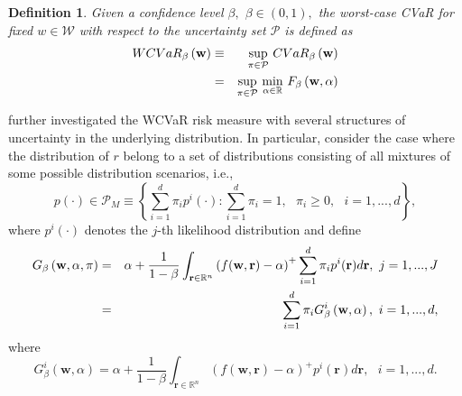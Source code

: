 \documentclass[a4paper,12pt]{report}
\newtheorem{definition}{Definition}
\begin{document}
\begin{refsection}
\bigskip

\begin{definition}
	Given a confidence level $\beta ,$ $\beta \in (0,1),$ the worst-case CVaR
	for fixed $w\in \mathcal{W}$ with respect to the uncertainty set $\mathcal{P}
	$ is defined as
	\begin{eqnarray}
	WCVaR_{\beta }\left( \mathbf{w}\right) &\equiv &\underset{\pi \in \mathcal{P}%
	}{\sup }~ CVaR_{\beta }\left( \mathbf{w}\right)  \notag \\
	&=&\underset{\pi \in \mathcal{P}}{\sup }~\underset{\alpha \in
		\mathbb{R}
	}{\min }~F_{\beta }\left(\mathbf{w},\alpha \right)  \label{14}
	\end{eqnarray}
\end{definition}

\citet*{zhu2009worst} further investigated the WCVaR risk measure with
several structures of uncertainty in the underlying distribution. In
particular, \citet*{zhu2009worst} consider the case where the distribution
of $r$ belong to a set of distributions consisting of all mixtures of some
possible distribution scenarios, i.e.,
\begin{equation}
p\left( \cdot \right) \in \mathcal{P}_{M}\equiv \left\{ \sum_{i=1}^{d}\pi
_{i}p^{i}\left( \cdot \right) :\sum_{i=1}^{d}\pi _{i}=1,\text{ }\pi _{i}\geq
0,\text{ }i=1,...,d\right\} ,  \label{15}
\end{equation}%
where $p^{i}\left( \cdot \right) $ denotes the $j$-th likelihood
distribution and define
\begin{eqnarray}
G_{\beta }\left( \mathbf{w},\alpha ,\pi \right) &=&\alpha +\frac{1}{1-\beta }%
\int_{\mathbf{r}\in
	\mathbb{R}
	^{n}}\left( f(\mathbf{w},\mathbf{r})-\alpha \right) ^{+}\sum_{i=1}^{d}\pi
_{i}p^{i}(\mathbf{r})d\mathbf{r},\text{ }j=1,...,J  \notag \\
&=&\sum_{i=1}^{d}\pi _{i}G_{\beta }^{i}\left( \mathbf{w},\alpha \right) ,%
\text{ }i=1,...,d,  \label{16}
\end{eqnarray}%
where%
\begin{equation}
G_{\beta }^{i}\left( \mathbf{w},\alpha \right) =\alpha +\frac{1}{1-\beta }%
\int_{\mathbf{r}\in
	\mathbb{R}
	^{n}}\left( f(\mathbf{w},\mathbf{r})-\alpha \right) ^{+}p^{i}(\mathbf{r})d%
\mathbf{r},\text{ }i=1,...,d.  \label{17}
\end{equation}%


\end{refsection}
\end{document}
